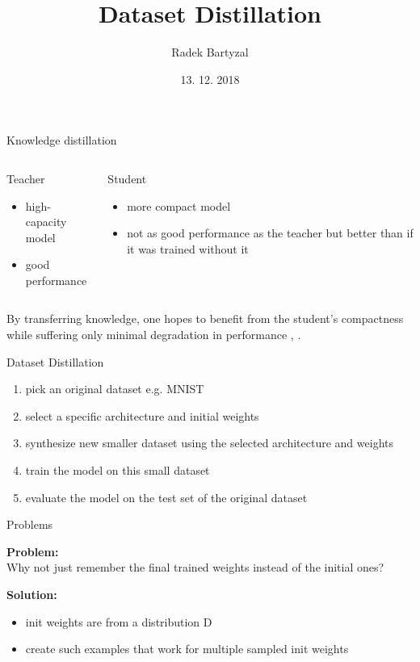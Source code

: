 \documentclass{beamer}
\begin{document}
\title{Dataset Distillation}  
\author{Radek Bartyzal}
\date{13. 12. 2018} 

\frame{\titlepage} 

\begin{frame}[t]{Knowledge distillation}

\begin{columns}[t]
\begin{column}{0.5\textwidth}
Teacher
\begin{itemize}
\item high-capacity model
\item good performance
\end{itemize}
\end{column}

\begin{column}{0.5\textwidth}
Student
\begin{itemize}
\item more compact model
\item not as good performance as the teacher but better than if it was trained without it
\end{itemize}
\end{column}

\end{columns}

\vfill
By transferring knowledge, one hopes to benefit from the student’s
compactness while suffering only minimal degradation in performance \cite{cit:anc}, \cite{cit:distill}.

\end{frame}
\begin{frame}{Dataset Distillation}

\begin{enumerate}
\item pick an original dataset e.g. MNIST
\item select a specific architecture and initial weights
\item synthesize new smaller dataset using the selected architecture and weights
\item train the model on this small dataset
\item evaluate the model on the test set of the original dataset
\end{enumerate}

\end{frame}
\begin{frame}{Problems}

\textbf{Problem:}\\
Why not just remember the final trained weights instead of the initial ones?

\vfill

\textbf{Solution:}
\begin{itemize}
\item init weights are from a distribution D
\item create such examples that work for multiple sampled init weights
\end{itemize}

\end{frame}
\end{document}
